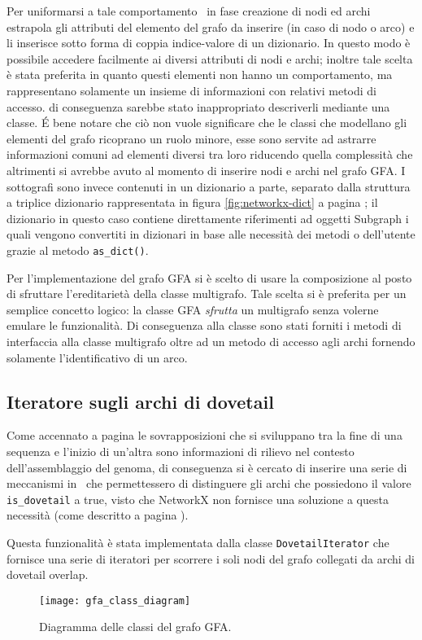 Per uniformarsi a tale comportamento \pygfa \  in fase creazione di nodi ed
archi estrapola gli attributi del elemento del grafo da inserire (in caso di nodo o arco)
e li inserisce sotto forma di coppia indice-valore di un dizionario. In questo modo
è possibile accedere facilmente ai diversi attributi di nodi e archi; inoltre
tale scelta è stata preferita in quanto questi elementi non hanno un comportamento,
ma rappresentano solamente un insieme di informazioni con relativi metodi di accesso.
di conseguenza sarebbe stato inappropriato descriverli mediante una classe.
\'E bene notare che ciò non vuole significare che le classi che modellano gli elementi
del grafo ricoprano un ruolo minore, esse sono servite ad astrarre informazioni
comuni ad elementi diversi tra loro riducendo quella complessità che altrimenti si
avrebbe avuto al momento di inserire nodi e archi nel grafo GFA.
I sottografi sono invece contenuti in un dizionario a parte, separato dalla struttura a
triplice dizionario rappresentata in figura \ref{fig:networkx-dict} a pagina \pageref{fig:networkx-dict};
il dizionario in questo caso contiene direttamente riferimenti ad oggetti Subgraph i quali
vengono convertiti in dizionari in base alle necessità dei metodi o dell'utente grazie
al metodo \texttt{as\_dict()}.

Per l'implementazione del grafo GFA si è scelto di usare la composizione al posto
di sfruttare l'ereditarietà della classe multigrafo. Tale scelta si è preferita per
un semplice concetto logico: la classe GFA \emph{sfrutta} un multigrafo senza
volerne emulare le funzionalità. Di conseguenza alla classe sono stati forniti i metodi di interfaccia
alla classe multigrafo oltre ad un metodo di accesso agli archi fornendo
solamente l'identificativo di un arco.

\subsection{Iteratore sugli archi di dovetail}
Come accennato a pagina \pageref{sec:link} le sovrapposizioni
che si sviluppano tra la fine di una sequenza e l'inizio di un'altra sono
informazioni di rilievo nel contesto dell'assemblaggio del genoma,
di conseguenza si è cercato di inserire una serie di meccanismi in \pygfa \ 
che permettessero di distinguere gli archi che possiedono
il valore \texttt{is\_dovetail} a true, visto che NetworkX non fornisce
una soluzione a questa necessità (come descritto a pagina \pageref{sec:nx-why-limits}).

Questa funzionalità è stata implementata dalla classe \texttt{DovetailIterator} che
fornisce una serie di iteratori per scorrere i soli nodi del grafo collegati da archi di
dovetail overlap.
\noindent
\begin{figure}[t]
	\centering
	\texttt{[image: gfa\_class\_diagram]}
	\caption[Diagramma delle classi del grafo GFA]{Diagramma delle classi del grafo GFA.}
\end{figure}
\clearpage

